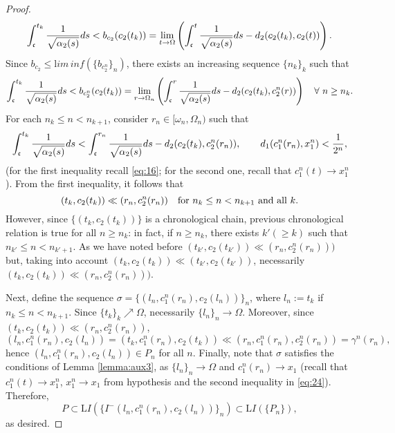 \begin{proof}
      \[
\int_{\mathfrak{c}}^{t_k}\frac{1}{\sqrt{\alpha_2(s)}}ds < b_{c_2}(c_2(t_k))=\lim_{t\rightarrow \Omega} \left(\int_{\mathfrak{c}}^t \frac{1}{\sqrt{\alpha_2(s)}}ds - d_2(c_2(t_k),c_2(t))\right).
        \]
Since $b_{c_2}\leq {\mathrm lim\,inf}(\{b_{c_2^n}\}_n)$, there exists an increasing sequence $\{n_k\}_k$ such that
\begin{equation}
  \label{eq:16}
\int_{\mathfrak{c}}^{t_k}\frac{1}{\sqrt{\alpha_2(s)}}ds<b_{c^n_2}(c_2(t_k))=\lim_{r\rightarrow \Omega_n} \left(\int_{\mathfrak{c}}^{r}\frac{1}{\sqrt{\alpha_2(s)}}ds- d_2(c_2(t_k),c_2^n(r))\right)\quad\hbox{$\forall$ $n\geq n_k$.}
\end{equation}
  For each $n_k\leq n<n_{k+1}$, consider $r_n\in [\omega_{n},\Omega_n)$ such that
  \begin{equation}
    \label{eq:24}
\int_{\mathfrak{c}}^{t_k}\frac{1}{\sqrt{\alpha_2(s)}}ds< \int_{\mathfrak{c}}^{r_n}\frac{1}{\sqrt{\alpha_2(s)}}ds-d_2(c_2(t_k),c_2^n(r_n)),\qquad d_{1}(c_1^n(r_n),x_1^n)<\frac{1}{2^n},
  \end{equation}
    (for the first inequality recall \eqref{eq:16}; for the second one, recall that $c_1^n(t)\rightarrow x_1^n$). From the first inequality, it follows that
    \[
    (t_k,c_2(t_k))\ll (r_n,c_2^n(r_n))\quad\hbox{for $n_k\leq n< n_{k+1}$ and all $k$.}
    \]
    However, since $\{(t_k,c_2(t_k))\}$ is a chronological chain, previous chronological relation is true for all $n\geq n_k$: in fact, if $n\geq n_k$, there exists $k'(\geq k)$ such that $n_{k'}\leq n < n_{k'+1}$. As we have noted before $(t_{k'},c_2(t_{k'}))\ll (r_n,c_2^n(r_n)))$ but, taking into account $(t_k,c_2(t_k))\ll (t_{k'},c_2(t_{k'}))$, necessarily $(t_{k},c_2(t_{k}))\ll (r_n,c_2^n(r_n)))$.

    Next, define the sequence $\sigma=\{(l_n,c^n_1(r_n),c_2(l_n))\}_n$, where $l_n:=t_k$ if $n_{k}\leq n< n_{k+1}$. Since $\{t_k\}_k\nearrow \Omega$, necessarily $\{l_n\}_n\rightarrow \Omega$. Moreover, since $(t_k,c_2(t_k))\ll (r_n,c_2^n(r_n))$,
    \[(l_n,c^n_1(r_n),c_2(l_n))=(t_k,c_1^n(r_n),c_2(t_k))\ll (r_n,c_1^n(r_n),c^n_2(r_n))=\gamma^n(r_n),\] hence $(l_n,c^n_1(r_n),c_2(l_n))\in P_n$ for all $n$. Finally, note that $\sigma$ satisfies the conditions of Lemma \ref{lemma:aux3}, as $\{l_n\}_n\rightarrow \Omega$ and $c_1^n(r_n)\rightarrow x_1$ (recall that $c_1^n(t)\rightarrow x_1^n$, $x_1^n\rightarrow x_1$ from hypothesis and the second inequality in \eqref{eq:24}). Therefore,
\[
    P\subset {\mathrm LI}(\{I^-(l_n,c^n_1(r_n),c_2(l_n))\}_n)\subset {\mathrm LI}(\{P_n\}),
    \]
    as desired.
  \end{proof}

